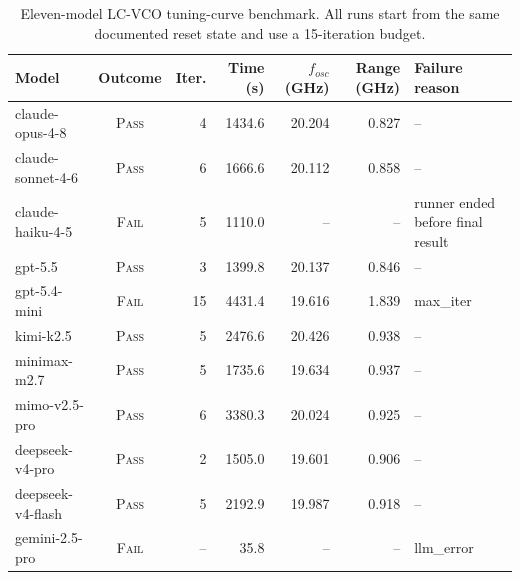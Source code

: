 \documentclass[acmsmall,review,anonymous]{acmart}
\newcommand{\pass}{\textsc{Pass}}
\newcommand{\fail}{\textsc{Fail}}
\begin{document}
\begin{table}[t]
  \centering
  \caption{Eleven-model LC-VCO tuning-curve benchmark. All runs start from the
  same documented reset state and use a 15-iteration budget.}
  \label{tab:lcvco}
  \footnotesize
  \begin{tabular}{l c r r r r l}
    \toprule
    Model & Outcome & Iter. & Time (s) & $f_{osc}$ (GHz) & Range (GHz) & Failure reason \\
    \midrule
    claude-opus-4-8   & \pass & 4  & 1434.6 & 20.204 & 0.827 & -- \\
    claude-sonnet-4-6 & \pass & 6  & 1666.6 & 20.112 & 0.858 & -- \\
    claude-haiku-4-5  & \fail & 5  & 1110.0 & --     & --    & runner ended before final result \\
    gpt-5.5           & \pass & 3  & 1399.8 & 20.137 & 0.846 & -- \\
    gpt-5.4-mini      & \fail & 15 & 4431.4 & 19.616 & 1.839 & max\_iter \\
    kimi-k2.5         & \pass & 5  & 2476.6 & 20.426 & 0.938 & -- \\
    minimax-m2.7      & \pass & 5  & 1735.6 & 19.634 & 0.937 & -- \\
    mimo-v2.5-pro     & \pass & 6  & 3380.3 & 20.024 & 0.925 & -- \\
    deepseek-v4-pro   & \pass & 2  & 1505.0 & 19.601 & 0.906 & -- \\
    deepseek-v4-flash & \pass & 5  & 2192.9 & 19.987 & 0.918 & -- \\
    gemini-2.5-pro    & \fail & -- & 35.8   & --     & --    & llm\_error \\
    \bottomrule
  \end{tabular}
\end{table}
\end{document}
